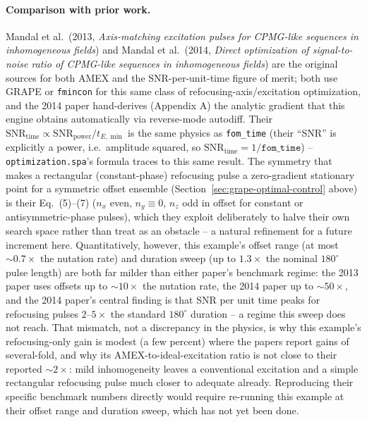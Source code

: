 \documentclass[11pt,oneside]{report}
\newcommand{\code}[1]{\texttt{#1}}
\begin{document}
\paragraph{Comparison with prior work.} Mandal et al.\ (2013, \emph{Axis-matching
excitation pulses for CPMG-like sequences in inhomogeneous fields}) and Mandal
et al.\ (2014, \emph{Direct optimization of signal-to-noise ratio of CPMG-like
sequences in inhomogeneous fields}) are the original sources for both AMEX and
the SNR-per-unit-time figure of merit; both use GRAPE or \code{fmincon} for
this same class of refocusing-axis/excitation optimization, and the 2014 paper
hand-derives (Appendix A) the analytic gradient that this engine obtains
automatically via reverse-mode autodiff. Their \(\mathrm{SNR}_{\text{time}}
\propto \mathrm{SNR}_{\text{power}}/t_{E,\min}\) is the same physics as
\code{fom\_time} (their ``SNR'' is explicitly a power, i.e.\ amplitude squared,
so \(\mathrm{SNR}_{\text{time}} = 1/\code{fom\_time}\)) -- \code{optimization.spa}'s
formula traces to this same result. The symmetry that makes a rectangular
(constant-phase) refocusing pulse a zero-gradient stationary point for a
symmetric offset ensemble (Section~\ref{sec:grape-optimal-control} above) is their Eq.~(5)--(7)
(\(n_x\) even, \(n_y\equiv 0\), \(n_z\) odd in offset for constant or
antisymmetric-phase pulses), which they exploit deliberately to halve their own
search space rather than treat as an obstacle -- a natural refinement for a
future increment here. Quantitatively, however, this example's offset range
(at most \(\sim 0.7\times\) the nutation rate) and duration sweep (up to
\(1.3\times\) the nominal \(180^\circ\) pulse length) are both far milder than
either paper's benchmark regime: the 2013 paper uses offsets up to
\(\sim 10\times\) the nutation rate, the 2014 paper up to \(\sim 50\times\), and
the 2014 paper's central finding is that SNR per unit time peaks for refocusing
pulses \(2\)--\(5\times\) the standard \(180^\circ\) duration -- a regime this
sweep does not reach. That mismatch, not a discrepancy in the physics, is why
this example's refocusing-only gain is modest (a few percent) where the papers
report gains of several-fold, and why its AMEX-to-ideal-excitation ratio is not
close to their reported \(\sim 2\times\): mild inhomogeneity leaves a
conventional excitation and a simple rectangular refocusing pulse much closer
to adequate already. Reproducing their specific benchmark numbers directly
would require re-running this example at their offset range and duration
sweep, which has not yet been done.
\end{document}

